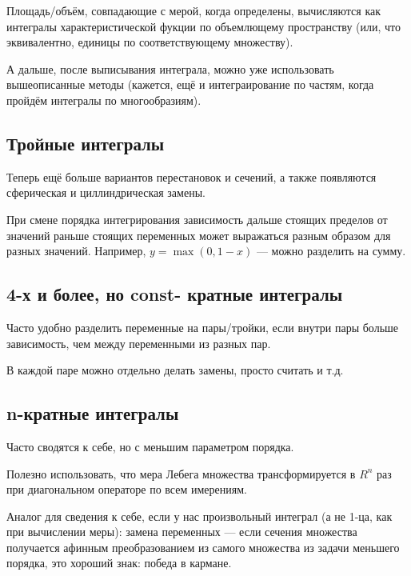 \documentclass[12pt, a4paper]{article}
\begin{document}
Площадь/объём, совпадающие с мерой, когда определены,
вычисляются как интегралы характеристической фукции по объемлющему пространству
(или, что эквивалентно, единицы по соответствующему множеству).

А дальше, после выписывания интеграла, можно уже использовать вышеописанные методы (кажется, ещё и интеграирование по частям, когда пройдём интегралы по многообразиям).


\subsection{Тройные интегралы}

Теперь ещё больше вариантов перестановок и сечений,
а также появляются сферическая и циллиндрическая замены. 

При смене порядка интегрирования зависимость дальше стоящих пределов от значений раньше стоящих переменных может выражаться разным образом для разных значений.
Например, $y = \max(0, 1 - x)$ — можно разделить на сумму.


\subsection{4-х и более, но const- кратные интегралы}

Часто удобно разделить переменные на пары/тройки, если внутри пары больше зависимость, чем между переменными из разных пар.

В каждой паре можно отдельно делать замены, просто считать и т.д.


\subsection{n-кратные интегралы}

Часто сводятся к себе, но с меньшим параметром порядка.

Полезно использовать, что мера Лебега множества трансформируется в $R^n$ раз при диагональном операторе по всем имерениям.

Аналог для сведения к себе, если у нас произвольный интеграл (а не 1-ца, как при вычислении меры): замена переменных — если сечения множества получается афинным преобразованием
из самого множества из задачи меньшего порядка, это хороший знак: победа в кармане.
\end{document}
